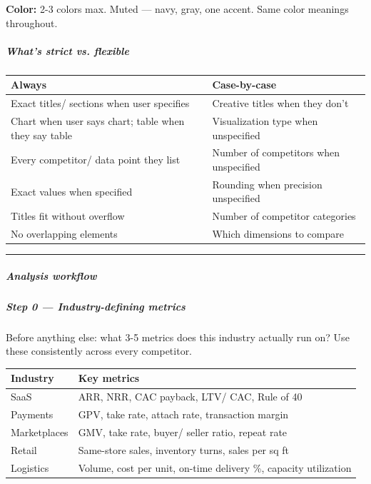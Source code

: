 \documentclass[11pt]{article}
\begin{document}
\textbf{Color:} 2-3 colors max. Muted — navy, gray, one accent. Same color meanings throughout.


\subparagraph{What's strict vs. flexible}\mbox{}\par

\begingroup
\small
\setlength{\tabcolsep}{2pt}
\begin{longtable}{>{\RaggedRight\arraybackslash\hspace{0pt}}p{}>{\RaggedRight\arraybackslash\hspace{0pt}}p{}}
\toprule
{} \textbf{Always} & \textbf{Case-by-case} \\
\midrule
{} Exact titles/ sections when user specifies & Creative titles when they don't \\
{} Chart when user says chart; table when they say table & Visualization type when unspecified \\
{} Every competitor/ data point they list & Number of competitors when unspecified \\
{} Exact values when specified & Rounding when precision unspecified \\
{} Titles fit without overflow & Number of competitor categories \\
{} No overlapping elements & Which dimensions to compare \\
\bottomrule
\end{longtable}
\endgroup

\vspace{0.5em}\hrule\vspace{0.5em}

\subparagraph{Analysis workflow}\mbox{}\par

\subparagraph{Step 0 — Industry-defining metrics}\mbox{}\par

Before anything else: what 3-5 metrics does this industry actually run on? Use these consistently across every competitor.


\begingroup
\small
\setlength{\tabcolsep}{2pt}
\begin{longtable}{>{\RaggedRight\arraybackslash\hspace{0pt}}p{}>{\RaggedRight\arraybackslash\hspace{0pt}}p{}}
\toprule
{} \textbf{Industry} & \textbf{Key metrics} \\
\midrule
{} SaaS & ARR, NRR, CAC payback, LTV/ CAC, Rule of 40 \\
{} Payments & GPV, take rate, attach rate, transaction margin \\
{} Marketplaces & GMV, take rate, buyer/ seller ratio, repeat rate \\
{} Retail & Same-store sales, inventory turns, sales per sq ft \\
{} Logistics & Volume, cost per unit, on-time delivery \%, capacity utilization \\
\bottomrule
\end{longtable}
\endgroup
\end{document}
